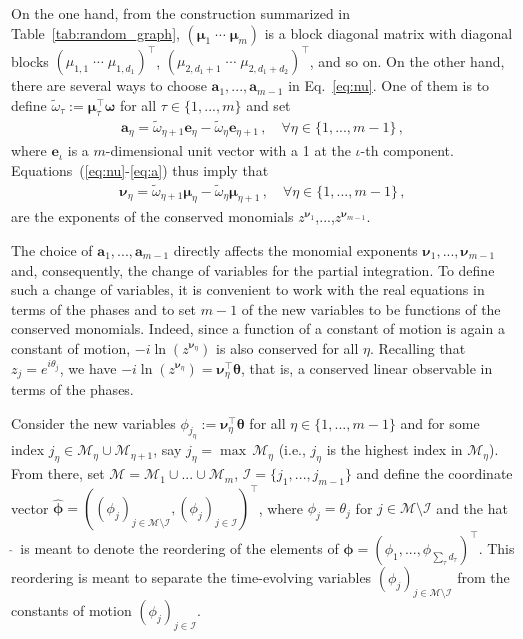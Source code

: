 \documentclass[aps,pre,reprint,longbibliography,superscriptaddress,noshowpacs,floatfix]{revtex4-2}
\theoremstyle{definition}
\theoremstyle{remark}
\begin{document}
On the one hand, from the construction summarized in Table~\ref{tab:random_graph}, $(\bm{\mu}_{1} \; \cdots \; \bm{\mu}_{m})$ is a block diagonal matrix with diagonal blocks $(\mu_{1,1} \; \cdots \;\mu_{1,d_1})^\top$, $(\mu_{2,d_1+1}\; \cdots \;\mu_{2, d_1 + d_2})^\top$, and so on. On the other hand, there are several ways to choose $\bm{a}_{1},...,\bm{a}_{m-1}$ in Eq.~\eqref{eq:nu}. One of them is to define $\tilde{\omega}_\tau := \bm{\mu}_\tau^\top \bm{\omega}$ for all $\tau\in\{1,...,m\}$ and set
\begin{align}\label{eq:a}
    \bm{a}_\eta = \tilde{\omega}_{\eta + 1}\bm{e}_\eta - \tilde{\omega}_{\eta}\bm{e}_{\eta + 1}\,,\quad \forall \eta\in\{1,...,m-1\}\,,
\end{align}
where $\bm{e}_\iota$ is a $m$-dimensional unit vector with a 1 at the $\iota$-th component. Equations~(\ref{eq:nu}-\ref{eq:a}) thus imply that
\begin{align}\label{eq:nueta}
    \bm{\nu}_\eta = \tilde{\omega}_{\eta + 1}\bm{\mu}_\eta - \tilde{\omega}_{\eta}\bm{\mu}_{\eta + 1}\,,\quad \forall \eta\in\{1,...,m-1\}\,,
\end{align}
are the exponents of the conserved monomials $z^{\bm{\nu}_1}$,...,$z^{\bm{\nu}_{m-1}}$.

The choice of $\bm{a}_{1},...,\bm{a}_{m-1}$ directly affects the monomial exponents $\bm{\nu}_{1},...,\bm{\nu}_{m-1}$ and, consequently, the change of variables for the partial integration. To define such a change of variables, it is convenient to work with the real equations in terms of the phases and to set $m-1$ of the new variables to be functions of the conserved monomials. Indeed, since a function of a constant of motion is again a constant of motion, $-i\ln(z^{\bm{\nu}_\eta})$ is also conserved for all $\eta$. Recalling that $z_j = e^{i\theta_j}$, we have $-i\ln(z^{\bm{\nu}_\eta}) = \bm{\nu}_\eta^\top\bm\theta$, that is, a conserved linear observable in terms of the phases.


Consider the new variables $\phi_{j_\eta} := \bm{\nu}_\eta^\top\bm\theta$ for all $\eta\in\{1,...,m-1\}$ and for some index $j_\eta\in\mathcal{M}_{\eta}\cup \mathcal{M}_{\eta+1}$, say $j_\eta = \max\,\mathcal{M}_{\eta}$ (i.e., $j_\eta$ is the highest index in $\mathcal{M}_{\eta}$). From there, set $\mathcal{M} = \mathcal{M}_1\cup...\cup\mathcal{M}_m$, $\mathcal{I} = \{j_1,...,j_{m-1}\}$ and define the coordinate vector $\hat{\bm{\phi}} = ((\phi_j)_{j\in \mathcal{M}\setminus \mathcal{I}}, (\phi_j)_{j\in \mathcal{I}})^\top$, where $\phi_j = \theta_j$ for $j\in \mathcal{M}\setminus \mathcal{I}$ and the hat $\,\hat{}\,$ is meant to denote the reordering of the elements of $\bm{\phi} = (\phi_1,...,\phi_{\sum_\tau d_\tau})^\top$. This reordering is meant to separate the time-evolving variables $(\phi_j)_{j\in \mathcal{M}\setminus \mathcal{I}}$ from the constants of motion $(\phi_j)_{j\in \mathcal{I}}$.
\end{document}
